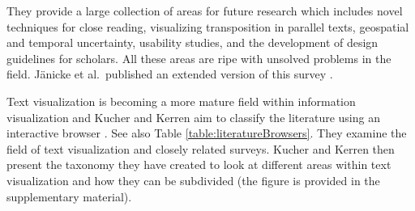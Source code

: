 %

They provide a large collection of areas for future research which includes novel techniques for close reading, visualizing transposition in parallel texts, geospatial and temporal uncertainty, usability studies, and the development of design guidelines for scholars. All these areas are ripe with unsolved problems in the field. J{\"a}nicke et al.\ published an extended version of this survey \cite{janicke2016visual}.

Text visualization is becoming a more mature field within information visualization and Kucher and Kerren aim to classify the literature using an interactive browser \cite{kucher2015text}. See also Table \ref{table:literatureBrowsers}.
They examine the field of text visualization and closely related surveys. Kucher and Kerren then present the taxonomy they have created to look at different areas within text visualization and how they can be subdivided (the figure is provided in the supplementary material).

